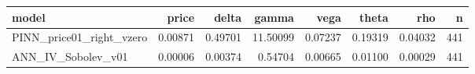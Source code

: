 \begin{tabular}{lrrrrrrr}
\toprule
model & price & delta & gamma & vega & theta & rho & n \\
\midrule
PINN_price01_right_vzero & 0.00871 & 0.49701 & 11.50099 & 0.07237 & 0.19319 & 0.04032 & 441 \\
ANN_IV_Sobolev_v01 & 0.00006 & 0.00374 & 0.54704 & 0.00665 & 0.01100 & 0.00029 & 441 \\
\bottomrule
\end{tabular}
